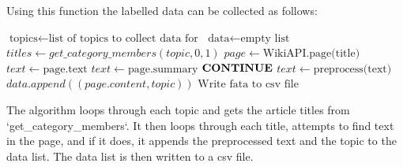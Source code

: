 Using this function the labelled data can be collected as follows:
\begin{algorithm}
    \caption{$\text{Algorithm to Retrieve Wikipedia Data}$}\label{alg:wiki-data}
    \begin{algorithmic}
        \STATE $\text{topics} \gets \text{list of topics to collect data for}$
        \STATE $\text{data} \gets \text{empty list}$
            \STATE $titles \gets get\_category\_members(topic, 0, 1)$
                \STATE $page \gets \text{WikiAPI.page(title)}$
                \STATE $text \gets \text{page.text}$
                    \STATE $text \gets \text{page.summary}$
                \ENDIF
                    \STATE $\text{\textbf{CONTINUE}}$
                \ENDIF
                \STATE $text \gets \text{preprocess(text)}$
                \STATE $data.append((page.content, topic))$
            \ENDFOR
        \ENDFOR
        \STATE $\text{Write fata to csv file}$
    \end{algorithmic}
\end{algorithm}

The algorithm loops through each topic and gets the article titles from `get\_category\_members`. It then loops through each title, attempts to find text in the page,
and if it does, it appends the preprocessed text and the topic to the data list. The data list is then written to a csv file.
